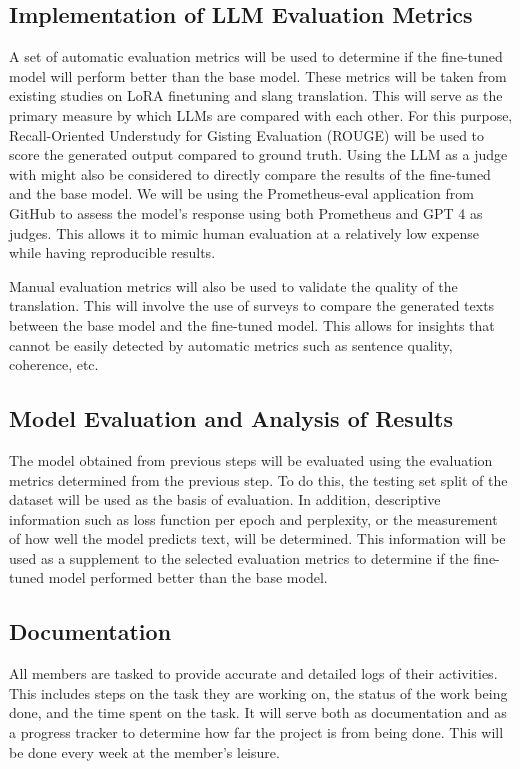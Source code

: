 \subsection{Implementation of LLM Evaluation Metrics}
A set of automatic evaluation metrics will be used to determine if the fine-tuned model will perform better than the base model.
These metrics will be taken from existing studies on LoRA finetuning and slang translation.
This will serve as the primary measure by which LLMs are compared with each other.
For this purpose, Recall-Oriented Understudy for Gisting Evaluation (ROUGE) will be used to score the generated output compared to ground truth.
Using the LLM as a judge with might also be considered to directly compare the results of the fine-tuned and the base model.
We will be using the Prometheus-eval application from GitHub to assess the model's response using both Prometheus and GPT 4 as judges.
This allows it to mimic human evaluation at a relatively low expense while having reproducible results.

Manual evaluation metrics will also be used to validate the quality of the translation.
This will involve the use of surveys to compare the generated texts between the base model and the fine-tuned model.
This allows for insights that cannot be easily detected by automatic metrics such as sentence quality, coherence, etc.

\subsection{Model Evaluation and Analysis of Results}
The model obtained from previous steps will be evaluated using the evaluation metrics determined from the previous step.
To do this, the testing set split of the dataset will be used as the basis of evaluation.
In addition, descriptive information such as loss function per epoch and perplexity, or the measurement of how well the model predicts text, will be determined.
This information will be used as a supplement to the selected evaluation metrics to determine if the fine-tuned model performed better than the base model.

\subsection{Documentation}
All members are tasked to provide accurate and detailed logs of their activities.
This includes steps on the task they are working on, the status of the work being done, and the time spent on the task.
It will serve both as documentation and as a progress tracker to determine how far the project is from being done.
This will be done every week at the member’s leisure.


